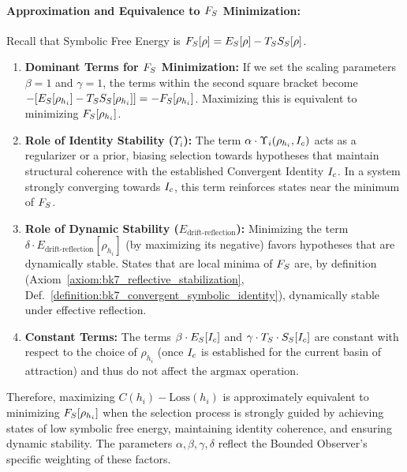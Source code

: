 \paragraph{Approximation and Equivalence to \(F_S\) Minimization:}
Recall that Symbolic Free Energy is \(F_S[\rho] = E_S[\rho] - T_S S_S[\rho]\).
\begin{enumerate}
    \item \textbf{Dominant Terms for \(F_S\) Minimization:} If we set the scaling parameters \(\beta = 1\) and \(\gamma = 1\), the terms within the second square bracket become \(-[E_S[\rho_{h_i}] - T_S S_S[\rho_{h_i}]] = -F_S[\rho_{h_i}]\). Maximizing this is equivalent to minimizing \(F_S[\rho_{h_i}]\).
    \item \textbf{Role of Identity Stability (\(\Upsilon_i\)):} The term \(\alpha \cdot \Upsilon_i(\rho_{h_i}, I_c)\) acts as a regularizer or a prior, biasing selection towards hypotheses that maintain structural coherence with the established Convergent Identity \(I_c\). In a system strongly converging towards \(I_c\), this term reinforces states near the minimum of \(F_S\).
    \item \textbf{Role of Dynamic Stability (\(E_{\text{drift-reflection}}\)):} Minimizing the term \(\delta \cdot E_{\text{drift-reflection}}[\rho_{h_i}]\) (by maximizing its negative) favors hypotheses that are dynamically stable. States that are local minima of \(F_S\) are, by definition (Axiom~\ref{axiom:bk7_reflective_stabilization}, Def.~\ref{definition:bk7_convergent_symbolic_identity}), dynamically stable under effective reflection.
    \item \textbf{Constant Terms:} The terms \(\beta \cdot E_S[I_c]\) and \(\gamma \cdot T_S \cdot S_S[I_c]\) are constant with respect to the choice of \(\rho_{h_i}\) (once \(I_c\) is established for the current basin of attraction) and thus do not affect the \(\text{argmax}\) operation.
\end{enumerate}
Therefore, maximizing \(C(h_i) - \text{Loss}(h_i)\) is approximately equivalent to minimizing \(F_S[\rho_{h_i}]\) when the selection process is strongly guided by achieving states of low symbolic free energy, maintaining identity coherence, and ensuring dynamic stability. The parameters \(\alpha, \beta, \gamma, \delta\) reflect the Bounded Observer's specific weighting of these factors.
